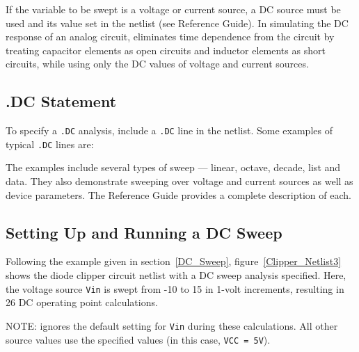 If the variable to be swept is a voltage or current source, a DC
source must be used and its value set in the netlist (see \Xyce{}
Reference Guide\ReferenceGuide{}). In simulating the DC response of an
analog circuit, \Xyce{} eliminates time dependence from the circuit by
treating capacitor elements as open circuits and inductor elements as
short circuits, while using only the DC values of voltage and current
sources.

\subsection{.DC Statement}

To specify a \verb|.DC| analysis, include a \verb|.DC| line in the netlist.  Some examples of typical \verb|.DC| lines are:


The examples include several types of sweep --- linear, octave,
decade, list and data.  They also demonstrate sweeping over voltage
and current sources as well as device parameters.  The \Xyce{}
Reference Guide\ReferenceGuide{} provides a complete description of
each.

\subsection{Setting Up and Running a DC Sweep}
\label{Running_DC_Sweep}

Following the example given in section~\ref{DC_Sweep},
figure~\ref{Clipper_Netlist3} shows the diode clipper circuit netlist
with a DC sweep analysis specified.  Here, the voltage source
\texttt{Vin} is swept from -10 to 15 in 1-volt increments, resulting
in 26 DC operating point calculations.

NOTE: \Xyce{} ignores the default setting for \texttt{Vin} during
these calculations.  All other source values use the specified values
(in this case, \texttt{VCC = 5V}).

